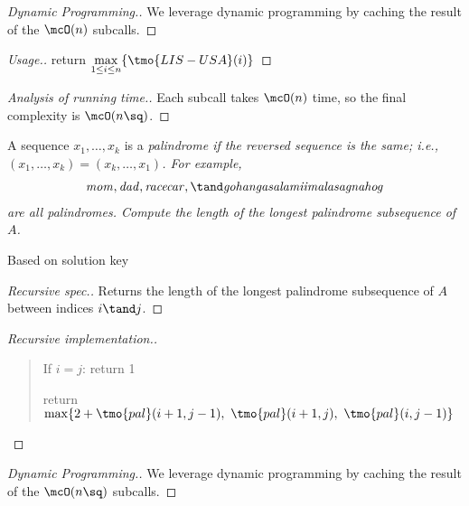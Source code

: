 \documentclass{article}
\begin{document}
\begin{proof}[Dynamic Programming.]
  We leverage dynamic programming by caching the result of the \( \mcO(n) \) subcalls.
\end{proof}

\begin{proof}[Usage.]
  return \( \max\limits_{1\leq i\leq n}\{\tmo{LIS-USA}(i)\} \)
\end{proof}

\begin{proof}[Analysis of running time.]
  Each subcall takes \( \mcO(n) \) time, so the final complexity is \( \mcO(n\sq) \).
\end{proof}
\pagebreak

\begin{subexercise}
A sequence \( x_1,\ldots, x_k \) is a \it{palindrome} if the reversed sequence is the same; i.e., \( (x_1,\ldots,x_k) = (x_k,\ldots,x_1) \). For example, \begin{align*}
  \it{mom, dad, racecar,\tand gohangasalamiimalasagnahog}
\end{align*}
are all palindromes. Compute the length of the longest palindrome subsequence of \( A \).
\end{subexercise}

\begin{note}
  Based on solution key
\end{note}

\begin{proof}[Recursive spec.]
  Returns the length of the longest palindrome subsequence of \( A \) between indices \( i \tand j \).
\end{proof}

\begin{proof}[Recursive implementation.]\
\begin{quote}
\begin{steps}
  \item If \( i = j \): return 1
  \item return \( \max\{ 2+\tmo{pal}(i+1,j-1),\ \tmo{pal}(i+1,j),\ \tmo{pal}(i,j-1) \} \)
\end{steps}
\end{quote}
\end{proof}

\begin{proof}[Dynamic Programming.]
  We leverage dynamic programming by caching the result of the \( \mcO(n\sq) \) subcalls.
\end{proof}
\end{document}
